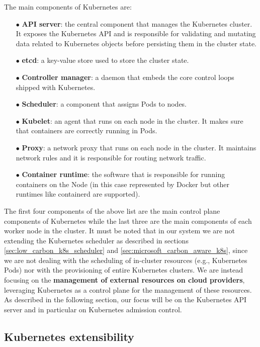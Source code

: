 The main components of Kubernetes are:
\begin{itemize}[itemsep=0.2pt, topsep=1pt]
    \item[$\bullet$] \textbf{API server}: the central component that manages the Kubernetes cluster. It exposes the Kubernetes API and is responsible for validating and mutating data related to Kubernetes objects before persisting them in the cluster state.
    \item[$\bullet$] \textbf{etcd}: a key-value store used to store the cluster state.
    \item[$\bullet$] \textbf{Controller manager}: a daemon that embeds the core control loops shipped with Kubernetes.
    \item[$\bullet$] \textbf{Scheduler}: a component that assigns Pods to nodes.
    \item[$\bullet$] \textbf{Kubelet}: an agent that runs on each node in the cluster. It makes sure that containers are correctly running in Pods.
    \item[$\bullet$] \textbf{Proxy}: a network proxy that runs on each node in the cluster. It maintains network rules and it is responsible for routing network traffic.
    \item[$\bullet$] \textbf{Container runtime}: the software that is responsible for running containers on the Node (in this case represented by Docker but other runtimes like containerd are supported).
\end{itemize}

The first four components of the above list are the main control plane components of Kubernetes while the last three are the main components of each worker node in the cluster.
It must be noted that in our system we are not extending the Kubernetes scheduler as described in sections \ref{sec:low_carbon_k8s_scheduler} and \ref{sec:microsoft_carbon_aware_k8s}, since we are not dealing with the scheduling of in-cluster resources (e.g., Kubernetes Pods) nor with the provisioning of entire Kubernetes clusters.
We are instead focusing on the \textbf{management of external resources on cloud providers}, leveraging Kubernetes as a control plane for the management of these resources.
As described in the following section, our focus will be on the Kubernetes API server and in particular on Kubernetes admission control.

\subsection{Kubernetes extensibility}
\label{sec:kubernetes_extensibility}

